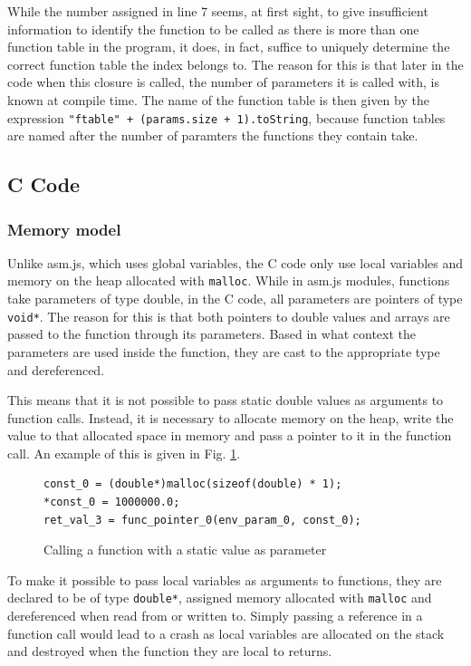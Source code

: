\documentclass[11pt]{report}
\begin{document}
While the number assigned in line 7 seems, at first sight, to give insufficient information to identify the function to be called as there is more than one function table in the program, it does, in fact, suffice to uniquely determine the correct function table the index belongs to. The reason for this is that later in the code when this closure is called, the number of parameters it is called with, is known at compile time. The name of the function table is then given by the expression \texttt{"ftable" + (params.size + 1).toString}, because function tables are named after the number of paramters the functions they contain take.


\subsection{C Code}
\subsubsection{Memory model}
Unlike asm.js, which uses global variables, the C code only use local variables and memory on the heap allocated with \texttt{malloc}. While in asm.js modules, functions take parameters of type double, in the C code, all parameters are pointers of type \texttt{void*}. The reason for this is that both pointers to double values and arrays are passed to the function through its parameters. Based in what context the parameters are used inside the function, they are cast to the appropriate type and dereferenced.

This means that it is not possible to pass static double values as arguments to function calls. Instead, it is necessary to allocate memory on the heap, write the value to that allocated space in memory and pass a pointer to it in the function call. An example of this is given in Fig. \ref{icmm1}.

\begin{figure}[ht]
\begin{lstlisting}
const_0 = (double*)malloc(sizeof(double) * 1);
*const_0 = 1000000.0;
ret_val_3 = func_pointer_0(env_param_0, const_0);
\end{lstlisting}
\caption{Calling a function with a static value as parameter}
\label{icmm1}
\end{figure}

To make it possible to pass local variables as arguments to functions, they are declared to be of type \texttt{double*}, assigned memory allocated with \texttt{malloc} and dereferenced when read from or written to. Simply passing a reference in a function call would lead to a crash as local variables are allocated on the stack and destroyed when the function they are local to returns.
\end{document}
